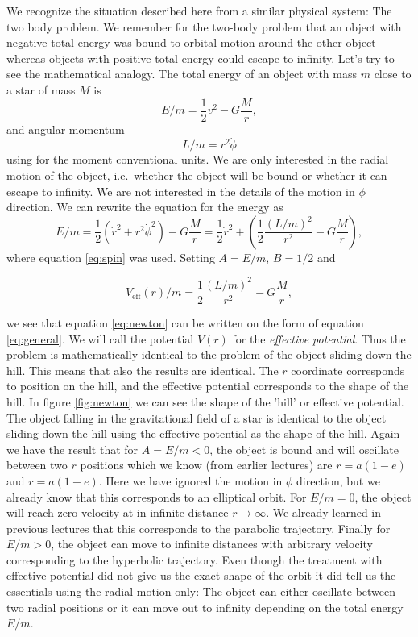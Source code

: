 \begin{multicols}{2}
We recognize the situation described here from a similar physical system: The two body problem. We remember for the two-body problem that an object with negative total energy was bound to orbital motion around the other object whereas objects with positive total energy could escape to infinity. Let's try to see the mathematical analogy. The total energy of an object with mass $m$ close to a star of mass $M$ is
\[
E/m=\frac{1}{2}v^2-G\frac{M}{r},
\] 
and angular momentum
\begin{equation}
\label{eq:spin}
L/m=r^2\dot{\phi}
\end{equation}
using for the moment conventional units. We are only interested in the radial motion of the object, i.e.\ whether the object will be bound or whether it can escape to infinity. We are not interested in the details of the motion in $\phi$ direction. We can rewrite the equation for the energy as
\begin{equation}
\label{eq:newton}
E/m=\frac{1}{2}(\dot{r}^2+r^2\dot{\phi}^2)-G\frac{M}{r}=\frac{1}{2}\dot{r}^2+\left(\frac{1}{2}\frac{(L/m)^2}{r^2}-G\frac{M}{r}\right),
\end{equation}
where equation \ref{eq:spin} was used. Setting $A=E/m$, $B=1/2$ and
\begin{formbox}
\[
V_\mathrm{eff}(r)/m=\frac{1}{2}\frac{(L/m)^2}{r^2}-G\frac{M}{r},
\]
\end{formbox}
we see that equation \ref{eq:newton} can be written on the form of equation \ref{eq:general}. We will call the potential $V(r)$ for the {\it effective potential}. Thus the problem is mathematically identical to the problem of the object sliding down the hill. This means that also the results are identical. The $r$ coordinate corresponds to position on the hill, and the effective potential corresponds to the shape of the hill. In figure \ref{fig:newton} we can see the shape of the 'hill' or effective potential. The object falling in the gravitational field of a star is identical to the object sliding down the hill using the effective potential as the shape of the hill. Again we have the result that for $A=E/m<0$, the object is bound and will oscillate between two $r$ positions which we know (from earlier lectures) are $r=a(1-e)$ and $r=a(1+e)$. Here we have ignored the motion in $\phi$ direction, but we already know that this corresponds to an elliptical orbit. For $E/m=0$, the object will reach zero velocity at in infinite distance $r\rightarrow\infty$. We already learned in previous lectures that this corresponds to the parabolic trajectory. Finally for $E/m>0$, the object can move to infinite distances with arbitrary velocity corresponding to the hyperbolic trajectory. Even though the treatment with effective potential did not give us the exact shape of the orbit it did tell us the essentials using the radial motion only: The object can either oscillate between two radial positions or it can move out to infinity depending on the total energy $E/m$.



\end{multicols}
